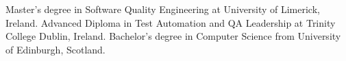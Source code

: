 \vspace{1em}
\begin{scholarship}
					{Master's degree in Software Quality Engineering at University of Limerick, Ireland.}
					{Advanced Diploma in Test Automation and QA Leadership at Trinity College Dublin, Ireland.}
					{Bachelor's degree in Computer Science from University of Edinburgh, Scotland.}
\end{scholarship}